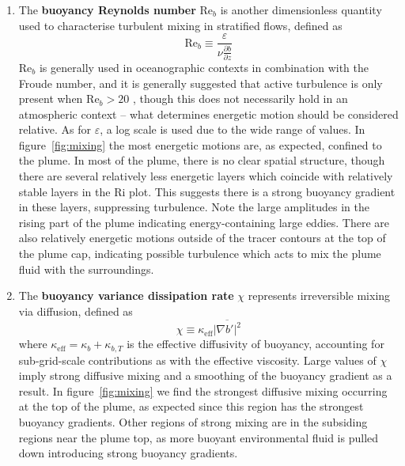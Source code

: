 \documentclass[a4paper]{article}
\begin{document}
\begin{enumerate}[label=(\alph*)]
	\item The \textbf{buoyancy Reynolds number} $\mathrm{Re}_b$ is another dimensionless quantity used to
		characterise turbulent mixing in stratified flows, defined as
		\begin{equation}
			\mathrm{Re}_b \equiv \frac{\varepsilon}{\nu \frac{\partial b}{\partial z}}
		\end{equation}
		$\mathrm{Re}_b$ is generally used in oceanographic contexts in combination with the Froude number, and
		it is generally suggested that active turbulence is only present when $\mathrm{Re}_b > 20$
		\citep{garcia2011}, though this does not necessarily hold in an atmospheric context -- what determines
		energetic motion should be considered relative. As for $\varepsilon$, a log scale is used due to the
		wide range of values. In figure~\ref{fig:mixing} the most energetic motions are, as expected, confined
		to the plume. In most of the plume, there is no clear spatial structure, though there are several
		relatively less energetic layers which coincide with relatively stable layers in the $\mathrm{Ri}$
		plot. This suggests there is a strong buoyancy gradient in these layers, suppressing turbulence. Note
		the large amplitudes in the rising part of the plume indicating energy-containing large eddies. There
		are also relatively energetic motions outside of the tracer contours at the top of the plume cap,
		indicating possible turbulence which acts to mix the plume fluid with the surroundings.

	\item The \textbf{buoyancy variance dissipation rate} $\chi$ represents irreversible mixing via diffusion,
		defined as
		\begin{equation}
			\chi \equiv \kappa_{\text{eff}} \overline{\left| \nabla b' \right|^2}
		\end{equation}
		where $\kappa_{\text{eff}} = \kappa_b + \kappa_{b,T}$ is the effective diffusivity of buoyancy,
		accounting for sub-grid-scale contributions as with the effective viscosity. Large values of $\chi$
		imply strong diffusive mixing and a smoothing of the buoyancy gradient as a result. In
		figure~\ref{fig:mixing} we find the strongest diffusive mixing occurring at the top of the plume, as
		expected since this region has the strongest buoyancy gradients. Other regions of strong mixing are in
		the subsiding regions near the plume top, as more buoyant environmental fluid is pulled down
		introducing strong buoyancy gradients.


\end{enumerate}
\end{document}

